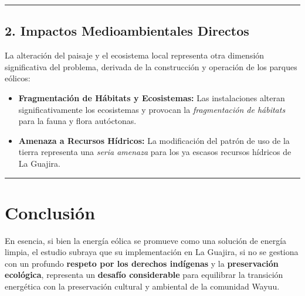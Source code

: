 \hrule

\subsection{2. Impactos Medioambientales Directos}

La alteración del paisaje y el ecosistema local representa otra dimensión significativa del problema, derivada de la construcción y operación de los parques eólicos:

\begin{itemize}
    \item \textbf{Fragmentación de Hábitats y Ecosistemas:} Las instalaciones alteran significativamente los ecosistemas y provocan la \textit{fragmentación de hábitats} para la fauna y flora autóctonas.
    \item \textbf{Amenaza a Recursos Hídricos:} La modificación del patrón de uso de la tierra representa una \textit{seria amenaza} para los ya escasos recursos hídricos de La Guajira.
\end{itemize}

\hrule

\section{Conclusión}

En esencia, si bien la energía eólica se promueve como una solución de energía limpia, el estudio subraya que su implementación en La Guajira, si no se gestiona con un profundo \textbf{respeto por los derechos indígenas} y la \textbf{preservación ecológica}, representa un \textbf{desafío considerable} para equilibrar la transición energética con la preservación cultural y ambiental de la comunidad Wayuu.
